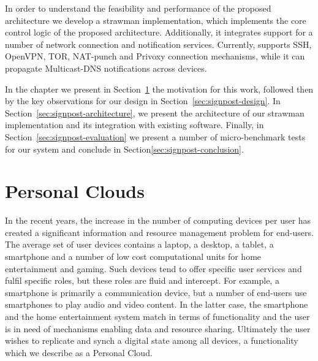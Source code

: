
In order to understand the feasibility and performance of the proposed
architecture we develop a strawman implementation, which implements the core
control logic of the proposed architecture.  Additionally, it integrates support
for a number of network connection and notification services.  Currently,
\signpost supports SSH, OpenVPN, TOR, NAT-punch and Privoxy connection
mechanisms, while it can propagate Multicast-DNS notifications across devices.

In the chapter we present in Section~\ref{sec:signpost-introduction} the
motivation for this work, followed then by the key observations for our design
in Section~\ref{sec:signpost-design}. In
Section~\ref{sec:signpost-architecture}, we present the architecture of our
strawman implementation and its integration with existing software. Finally, in
Section~\ref{sec:signpost-evaluation} we present a number of micro-benchmark
tests for our system and conclude in Section\ref{sec:signpost-conclusion}.

\section{Personal Clouds}\label{sec:signpost-introduction}

In the recent years, the increase in the number of computing devices per user
has created a significant information and resource management problem for
end-users. The average set of user devices contains a laptop, a desktop, a
tablet, a smartphone and a number of low cost computational units for home
entertainment and gaming.  Such devices tend to offer specific user services and
fulfil specific roles, but these roles are fluid and intercept. For example, a
smartphone is primarily a communication device, but a number of end-users use
smartphones to play audio and video content. In the latter case, the smartphone and
the home entertainment system match in terms of functionality and the user is in
need of mechanisms enabling data and resource sharing.  Ultimately the user
wishes to replicate and synch a digital state among all devices, a functionality
which we describe as a Personal Cloud. 

